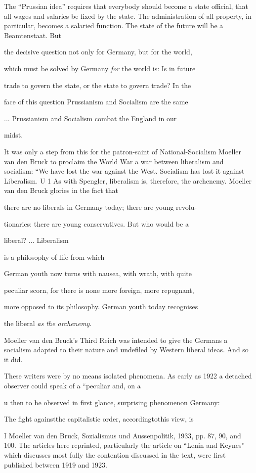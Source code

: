 \documentclass[11pt,openany]{book}
\begin{document}
The ``Prussian idea'' requires that everybody should become a state official, that all wages and salaries be fixed by the state. The administration of all property, in particular, becomes a salaried function. The state of the future will be a Beamtenstaat. But

the decisive question not only for Germany, but for the world,

which must be solved by Germany \emph{for} the world is: Is in future

trade to govern the state, or the state to govern trade? In the

face of this question Prussianism and Socialism are the same

... Prussianism and Socialism combat the England in our

midst.

It was only a step from this for the patron-saint of National-Socialism Moeller van den Bruck to proclaim the World War a war between liberalism and socialism: ``We have lost the war against the West. Socialism has lost it against Liberalism. U 1 As with Spengler, liberalism is, therefore, the archenemy. Moeller van den Bruck glories in the fact that

there are no liberals in Germany today; there are young revolu-

tionaries: there are young conservatives. But who would be a

liberal? ... Liberalism

is a philosophy of life from which

German youth now turns with nausea, with wrath, with quite

peculiar scorn, for there is none more foreign, more repugnant,

more opposed to its philosophy. German youth today recognises

the liberal \emph{as the archenemy}.

Moeller van den Bruck's Third Reich was intended to give the Germans a socialism adapted to their nature and undefiled by Western liberal ideas. And so it did.

These writers were by no means isolated phenomena. As early as 1922 a detached observer could speak of a ``peculiar and, on a

u then to be observed in first glance, surprising phenomenon Germany:

The fight againstthe capitalistic order, accordingtothis view, is

I Moeller van den Bruck, Sozialismus und Aussenpolitik, 1933, pp. 87, 90, and 100. The articles here reprinted, particularly the article on ``Lenin and Keynes'' which discusses most fully the contention discussed in the text, were first published between 1919 and 1923.
\end{document}
